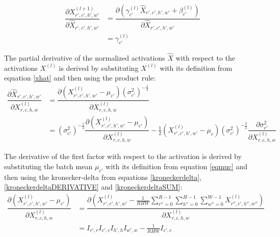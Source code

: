 \documentclass[a4paper, twoside]{article}
\newcommand*{\pd}[2]{\ensuremath{\dfrac{\partial #1}{\partial #2}}}
\begin{document}
\begin{equation}\label{BN_dxdxhat}
\begin{split}
	\pd{X^{(l+1)}_{r',c',h',w'}}{\hat{X}_{r',c',h',w'}}
		& = \pd{(\gamma_{c'}^{(l)} \hat{X}_{r',c',h',w'} + \beta_{c'}^{(l)})}{\hat{X}_{r',c',h',w'}} \\
		& =\gamma_{c'}^{(l)}
\end{split}
\end{equation}

The partial derivative of the normalized activations $\hat{X}$ with respect to the activations $X^{(l)}$ is derived by substituting $X^{(l)}$ with its definition from equation \eqref{xhat} and then using the product rule: \cite{webBN1} \cite{webBN2}
\begin{equation}\label{BN_kedjeregeln}
\begin{split}
\pd{\hat{X}_{r',c',h',w'}}{{X}^{(l)}_{r,c,h,w}} 
	& = \pd{(X^{(l)}_{r',c',h',w'} - \mu_{c'}){(\sigma^2_{c'})}^{-\frac{1}{2}}}{{X}^{(l)}_{r,c,h,w}} \\
	& = {(\sigma^2_{c'})}^{-\frac{1}{2}} \pd{(X^{(l)}_{r',c',h',w'} - \mu_{c'})}{{X}^{(l)}_{r,c,h,w}} - \frac{1}{2}(X^{(l)}_{r',c',h',w'} - \mu_c){(\sigma^2_{c'})}^{-\frac{3}{2}} \pd{\sigma^2_{c'}}{{X}^{(l)}_{r,c,h,w}}
\end{split}
\end{equation}

The derivative of the first factor with respect to the activation is derived by substituting the batch mean $\mu_{c'}$ with its definition from equation \eqref{eqmuc} and then using the kronecker-delta from equations \eqref{kroneckerdelta}, \eqref{kroneckerdeltaDERIVATIVE} and \eqref{kroneckerdeltaSUM}: \cite{webBN1} \cite{webBN2}
\begin{equation}\label{mu'}
\begin{split}
\pd{(X^{(l)}_{r',c',h',w'} - \mu_{c'})}{{X}^{(l)}_{r,c,h,w}}
	& = \pd{({X^{(l)}_{r',c',h',w'} - \frac{1}{RHW} \sum\limits^{R-1}_{r''=0} \sum\limits^{H-1}_{h''=0} \sum\limits^{W-1}_{w''=0} X^{(l)}_{r'',c',h'',w''}})}{{X}^{(l)}_{r,c,h,w}} \\
	& = I_{r',r} I_{c',c} I_{h',h} I_{w',w} - \frac{1}{RHW} I_{c',c}
\end{split}
\end{equation}
\end{document}
